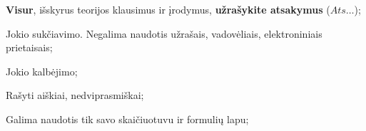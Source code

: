 \documentclass[a4paper]{article}
\begin{document}
\begin{enumerate}
\end{enumerate}

\begin{small}
      \begin{enumerate*}[label={(\arabic*)}]
            \item \textbf{Visur}, išskyrus teorijos klausimus ir įrodymus, \textbf{užrašykite atsakymus} ($Ats\ldots$);
            \item Jokio sukčiavimo. Negalima naudotis užrašais, vadovėliais,
            elektroniniais prietaisais;
            \item Jokio kalbėjimo;
            \item Rašyti aiškiai, nedviprasmiškai;
            \item Galima naudotis tik savo skaičiuotuvu ir formulių lapu;
      \end{enumerate*}
\end{small}
\end{document}

